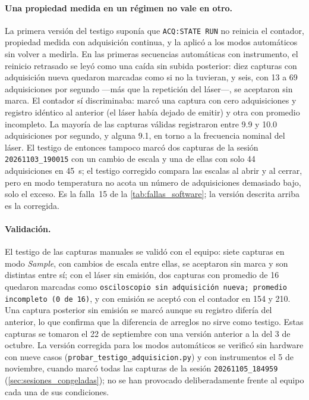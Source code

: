 \paragraph{Una propiedad medida en un régimen no vale en otro.} La
primera versión del testigo suponía que \texttt{ACQ:STATE RUN} no
reinicia el contador, propiedad medida con adquisición continua, y la
aplicó a los modos automáticos sin volver a medirla. En las primeras
secuencias automáticas con instrumento, el reinicio retrasado se leyó
como una caída sin subida posterior: diez capturas con adquisición
nueva quedaron marcadas como si no la tuvieran, y seis, con 13 a 69
adquisiciones por segundo ---más que la repetición del láser---, se
aceptaron sin marca. El contador sí discriminaba: marcó una captura con
cero adquisiciones y registro idéntico al anterior (el láser había
dejado de emitir) y otra con promedio incompleto. La mayoría de las
capturas válidas registraron entre 9.9 y 10.0 adquisiciones por
segundo, y alguna 9.1, en torno a la frecuencia nominal del láser. El
testigo de entonces tampoco marcó dos capturas de la sesión
\texttt{20261103\_190015} con un cambio de escala y una de ellas con
solo 44 adquisiciones en \SI{45}{\second}; el testigo corregido compara
las escalas al abrir y al cerrar, pero en modo temperatura no acota un
número de adquisiciones demasiado bajo, solo el exceso. Es la falla~15 de la \cref{tab:fallas_software}; la versión
descrita arriba es la corregida.

\paragraph{Validación.} El testigo de las capturas manuales se validó
con el equipo: siete capturas en modo \textit{Sample}, con cambios de
escala entre ellas, se aceptaron sin marca y son distintas entre sí; con
el láser sin emisión, dos capturas con promedio de 16 quedaron marcadas como
\texttt{osciloscopio sin adquisición nueva; promedio incompleto (0 de
16)}, y con emisión se aceptó con el contador en 154 y 210. Una captura
posterior sin emisión se marcó aunque su registro difería del anterior,
lo que confirma que la diferencia de arreglos no sirve como testigo.
Estas capturas se tomaron el 22 de septiembre con una versión anterior
a la del 3 de octubre. La versión corregida para los modos automáticos
se verificó sin hardware con nueve casos
(\texttt{probar\_\allowbreak{}testigo\_\allowbreak{}adquisicion.py}) y con instrumentos el 5 de
noviembre, cuando marcó todas las capturas de la sesión
\texttt{20261105\_184959} (\cref{sec:sesiones_congeladas}); no se han
provocado deliberadamente frente al equipo cada una de sus
condiciones.

